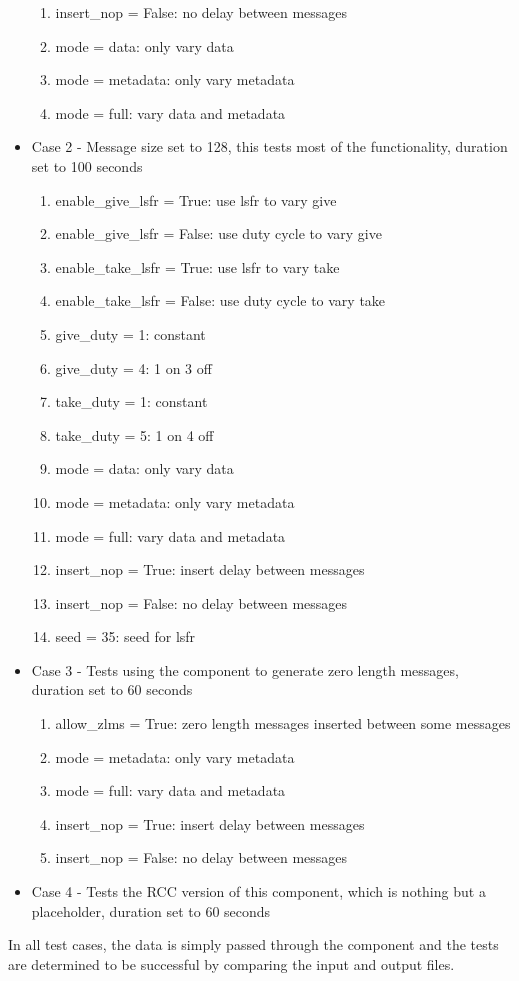 \documentclass{article}
\begin{document}
\begin{flushleft}
\begin{itemize}
\begin{enumerate}
	\item insert\_nop = False: no delay between messages
	\item mode = data: only vary data
	\item mode = metadata: only vary metadata
	\item mode = full: vary data and metadata
\end{enumerate}
\item Case 2 - Message size set to 128, this tests most of the functionality, duration set to 100 seconds
\begin{enumerate}
	\item enable\_give\_lsfr = True: use lsfr to vary give
	\item enable\_give\_lsfr = False: use duty cycle to vary give
	\item enable\_take\_lsfr = True: use lsfr to vary take
	\item enable\_take\_lsfr = False: use duty cycle to vary take
	\item give\_duty = 1: constant
	\item give\_duty = 4: 1 on 3 off
	\item take\_duty = 1: constant
	\item take\_duty = 5: 1 on 4 off
	\item mode = data: only vary data
	\item mode = metadata: only vary metadata
	\item mode = full: vary data and metadata
	\item insert\_nop = True: insert delay between messages
	\item insert\_nop = False: no delay between messages
	\item seed = 35: seed for lsfr
\end{enumerate}
\item Case 3 - Tests using the component to generate zero length messages, duration set to 60 seconds
\begin{enumerate}
	\item allow\_zlms = True: zero length messages inserted between some messages
	\item mode = metadata: only vary metadata
	\item mode = full: vary data and metadata
	\item insert\_nop = True: insert delay between messages
	\item insert\_nop = False: no delay between messages
\end{enumerate}
\item Case 4 - Tests the RCC version of this component, which is nothing but a placeholder, duration set to 60 seconds
\end{itemize}

In all test cases, the data is simply passed through the component and the tests are determined to be successful by comparing the input and output files.

\end{flushleft}
\end{document}
